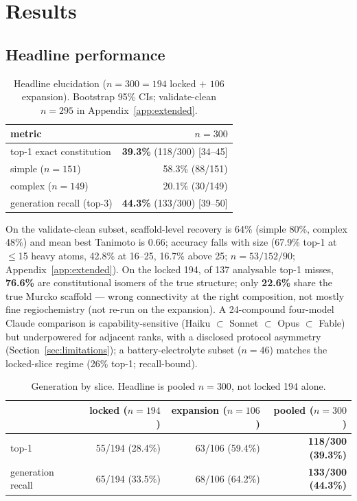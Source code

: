 \documentclass{article}
\begin{document}
\section{Results}
\label{sec:results}

\subsection{Headline performance}
\label{sec:headline}

\begin{table}[ht]
\caption{Headline elucidation ($n{=}300{=}194$ locked $+$ $106$ expansion).
Bootstrap 95\% CIs; validate-clean $n{=}295$ in Appendix~\ref{app:extended}.}
\label{tab:headline}
\centering
\small
\begin{tabular}{@{}lr@{}}
\toprule
metric & $n{=}300$ \\
\midrule
top-1 exact constitution & \textbf{39.3\%} (118/300) [34--45] \\
\quad simple ($n{=}151$) & 58.3\% (88/151) \\
\quad complex ($n{=}149$) & 20.1\% (30/149) \\
generation recall (top-3) & \textbf{44.3\%} (133/300) [39--50] \\
\bottomrule
\end{tabular}
\end{table}

On the validate-clean subset, scaffold-level recovery is 64\% (simple 80\%, complex 48\%) and
mean best Tanimoto is 0.66; accuracy falls with size (67.9\% top-1 at $\leq$15 heavy atoms,
42.8\% at 16--25, 16.7\% above 25; $n{=}53/152/90$; Appendix~\ref{app:extended}).
On the locked 194, of 137 analysable top-1 misses, \textbf{76.6\%} are constitutional isomers of the true
structure; only \textbf{22.6\%} share the true Murcko scaffold --- wrong connectivity at the
right composition, not mostly fine regiochemistry (not re-run on the expansion).
A 24-compound four-model Claude comparison is capability-sensitive (Haiku $\subset$ Sonnet
$\subset$ Opus $\subset$ Fable) but underpowered for adjacent ranks, with a disclosed protocol
asymmetry (Section~\ref{sec:limitations}); a battery-electrolyte subset ($n{=}46$) matches the
locked-slice regime (26\% top-1; recall-bound).

\begin{table}[ht]
\caption{Generation by slice. Headline is pooled $n{=}300$, not locked 194 alone.}
\label{tab:slices}
\centering
\small
\begin{tabular}{@{}lrrr@{}}
\toprule
 & locked ($n{=}194$) & expansion ($n{=}106$) & pooled ($n{=}300$) \\
\midrule
top-1 & 55/194 (28.4\%) & 63/106 (59.4\%) & \textbf{118/300 (39.3\%)} \\
generation recall & 65/194 (33.5\%) & 68/106 (64.2\%) & \textbf{133/300 (44.3\%)} \\
\bottomrule
\end{tabular}
\end{table}
\end{document}
